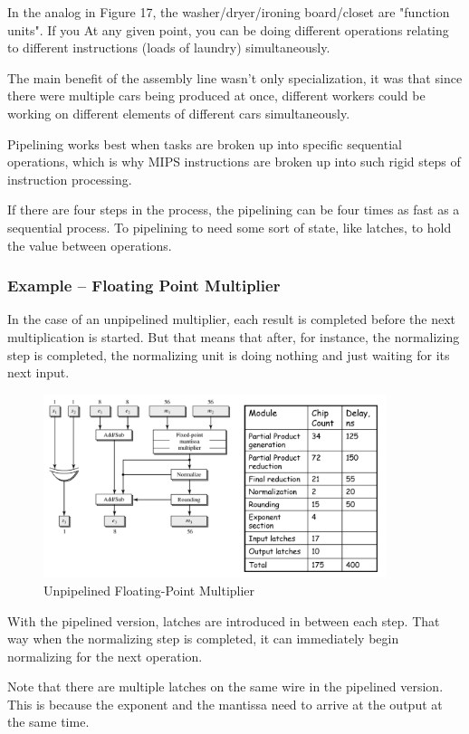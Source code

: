 \documentclass{article}
\begin{document}
In the analog in Figure 17, the washer/dryer/ironing board/closet are "function units". If you At any given point, you can be doing different operations relating to different instructions (loads of laundry) simultaneously. 

The main benefit of the assembly line wasn't only specialization, it was that since there were multiple cars being produced at once, different workers could be working on different elements of different cars simultaneously. 

Pipelining works best when tasks are broken up into specific sequential operations, which is why MIPS instructions are broken up into such rigid steps of instruction processing. 

If there are four steps in the process, the pipelining can be four times as fast as a sequential process. To pipelining to need some sort of state, like latches, to hold the value between operations.

\subsubsection{Example -- Floating Point Multiplier}

In the case of an unpipelined multiplier, each result is completed before the next multiplication is started. But that means that after, for instance, the normalizing step is completed, the normalizing unit is doing nothing and just waiting for its next input.

\begin{figure}[ht!]
\centering
\includegraphics[width=100mm]{img/FloatingPoint.png}
\caption{Unpipelined Floating-Point Multiplier}
\end{figure}

With the pipelined version, latches are introduced in between each step. That way when the normalizing step is completed, it can immediately begin normalizing for the next operation. 

Note that there are multiple latches on the same wire in the pipelined version. This is because the exponent and the mantissa need to arrive at the output at the same time.
\end{document}
